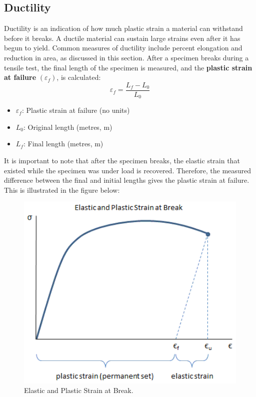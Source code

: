 \documentclass{article}
\begin{document}
\subsection{Ductility}\label{Ductility}
Ductility is an indication of how much plastic strain a material can withstand before it breaks. A ductile material can sustain large strains even after it has begun to yield. Common measures of ductility include percent elongation and reduction in area, as discussed in this section.
After a specimen breaks during a tensile test, the final length of the specimen is measured, and the \textbf{plastic strain at failure} $(\varepsilon_f)$, is calculated:
\begin{equation}
    \varepsilon_f = \frac{L_f - L_0}{L_0}
    \label{duc}
\end{equation}
\begin{itemize}[itemsep=-1mm]
    \item $\varepsilon_f$: Plastic strain at failure (no units)
    \item $L_0$: Original length (metres, m)
    \item $L_f$: Final length (metres, m)
\end{itemize}
It is important to note that after the specimen breaks, the elastic strain that existed while the specimen was under load is recovered. Therefore, the measured difference between the final and initial lengths gives the plastic strain at failure. This is illustrated in the figure below:\\[8pt]
\begin{minipage}{0.45\textwidth}\centering
    \begin{figure}[H]
    \centering
    \includegraphics[width=1.1\textwidth]{images/elastic-plastic-strain-at-break-01.png}
    \caption{Elastic and Plastic Strain at Break.}
    \label{fig:strain-break}
\end{figure}
\end{minipage}\hfill
\end{document}
